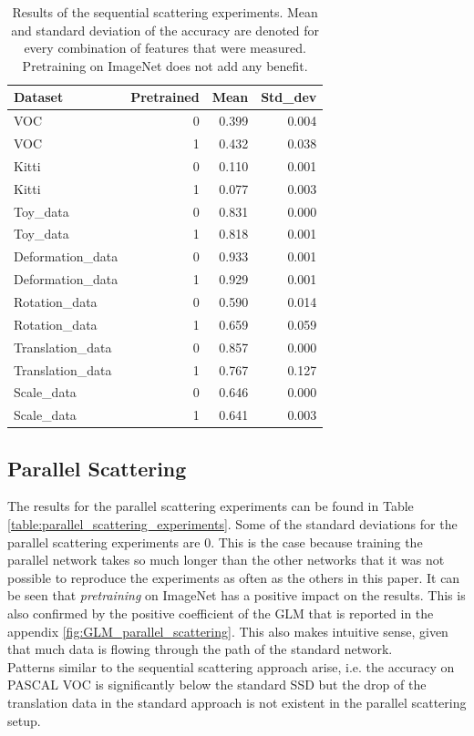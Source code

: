 \begin{table}[!htb]
	\centering
	\caption{Results of the sequential scattering experiments. Mean and standard deviation of the accuracy are denoted for every combination of features that were measured. Pretraining on ImageNet does not add any benefit.}
	\begin{tabular}{lrrr}
		\toprule
		Dataset &  Pretrained &   Mean &  Std\_dev \\
		\midrule
		VOC &           0 &  0.399 &    0.004 \\
		VOC &           1 &  0.432 &    0.038 \\\hdashline
		Kitti &           0 &  0.110 &    0.001 \\
		Kitti &           1 &  0.077 &    0.003 \\\hdashline
		Toy\_data &           0 &  0.831 &    0.000 \\
		Toy\_data &           1 &  0.818 &    0.001 \\\hdashline
		Deformation\_data &           0 &  0.933 &    0.001 \\
		Deformation\_data &           1 &  0.929 &    0.001 \\\hdashline
		Rotation\_data &           0 &  0.590 &    0.014 \\
		Rotation\_data &           1 &  0.659 &    0.059 \\\hdashline
		Translation\_data &           0 &  0.857 &    0.000 \\
		Translation\_data &           1 &  0.767 &    0.127 \\\hdashline
		Scale\_data &           0 &  0.646 &    0.000 \\
		Scale\_data &           1 &  0.641 &    0.003 \\
		\bottomrule
	\end{tabular}
\label{table:sequential_scattering_experiments}
\end{table}

\subsection{Parallel Scattering}
\label{subsec:parallel_scattering_results}


The results for the parallel scattering experiments can be found in Table \ref{table:parallel_scattering_experiments}. Some of the standard deviations for the parallel scattering experiments are 0. This is the case because training the parallel network takes so much longer than the other networks that it was not possible to reproduce the experiments as often as the others in this paper. It can be seen that \textit{pretraining} on ImageNet has a positive impact on the results. This is also confirmed by the positive coefficient of the GLM that is reported in the appendix \ref{fig:GLM_parallel_scattering}. This also makes intuitive sense, given that much data is flowing through the path of the standard network. \\ Patterns similar to the sequential scattering approach arise, i.e. the accuracy on PASCAL VOC is significantly below the standard SSD but the drop of the translation data in the standard approach is not existent in the parallel scattering setup.

